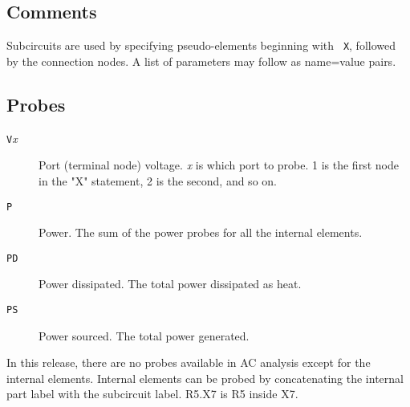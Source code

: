 \subsection{Comments}

Subcircuits are used by specifying pseudo-elements beginning with {\tt
X}, followed by the connection nodes.  A list of parameters may
follow as name=value pairs.
\subsection{Probes}

\begin{description}

\item[{\tt V}{\it x}]
Port (terminal node) voltage.  {\it x} is which port to probe.  1 is
the first node in the "X" statement, 2 is the second, and so on.

\item[{\tt P}]
Power.  The sum of the power probes for all the internal elements.

\item[{\tt PD}]
Power dissipated.  The total power dissipated as heat.

\item[{\tt PS}]
Power sourced.  The total power generated.

\end{description}

In this release, there are no probes available in AC analysis except
for the internal elements.  Internal elements can be probed by
concatenating the internal part label with the subcircuit label.
R5.X7 is R5 inside X7.

